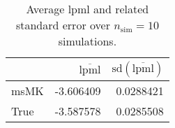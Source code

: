 \begin{table}[H]

\caption{Average lpml and related standard error over $n_{\text{sim}} = 10$ simulations.}
\centering
\begin{tabular}[t]{lrr}
\toprule
  & $\overbar{\text{lpml}}$ & $\text{sd}(\overbar{\text{lpml}})$\\
\midrule
msMK & -3.606409 & 0.0288421\\
True & -3.587578 & 0.0285508\\
\bottomrule
\end{tabular}
\end{table}